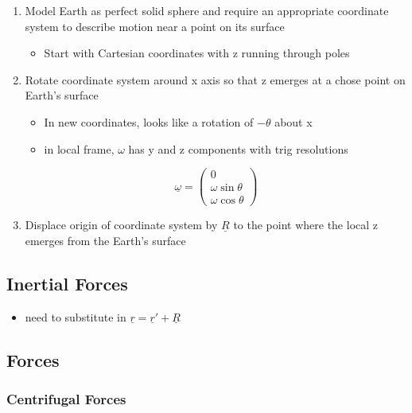 \documentclass[a4paper,11pt,normalem]{article}
\begin{document}
\begin{enumerate}
\item
  Model Earth as perfect solid sphere and require an appropriate
  coordinate system to describe motion near a point on its surface
  \begin{itemize}
  \item
    Start with Cartesian coordinates with z running through poles
  \end{itemize}
\item
  Rotate coordinate system around x axis so that z emerges at a chose
  point on Earth's surface
  \begin{itemize}
  \item
    In new coordinates, looks like a rotation of \(-\theta\) about x
  \item
    in local frame, \(\omega\) has y and z components with trig
    resolutions
  \end{itemize}

\[
    \underline{\omega} = \begin{pmatrix} 0 \\ \omega\sin\theta \\ \omega\cos\theta \end{pmatrix}
\]

\item
  Displace origin of coordinate system by \(\underline{R}\) to the point
  where the local z emerges from the Earth's surface
\end{enumerate}

\subsection{Inertial Forces}\label{intertial-forces}

\begin{itemize}
\item
  need to substitute in
  \(\underline{r} = \underline{r}' + \underline{R}\)
\end{itemize}

\subsection{Forces}\label{forces}

\subsubsection{Centrifugal Forces}\label{centrifugal-forces}
\end{document}
